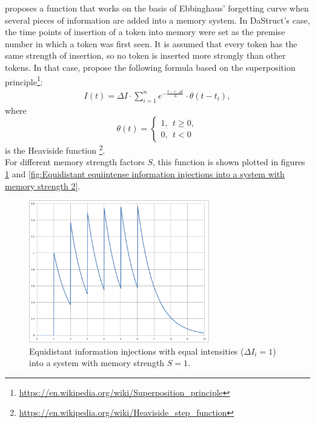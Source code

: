 \documentclass[hidelinks]{scrartcl}
\begin{document}
\cite*{Yffelti.2016} proposes a function that works on the basis of Ebbinghaus' forgetting curve when several pieces of information are added into a memory system. In DaStruct's case, the time points of insertion of a \gls{token} into memory were set as the \gls{premise} number in which a \gls{token} was first seen. It is assumed that every \gls{token} has the same strength of insertion, so no \gls{token} is inserted more strongly than other \gls{token}s. In that case, \cite{Yffelti.2016} propose the following formula based on the superposition principle\footnote{\url{https://en.wikipedia.org/wiki/Superposition_principle}}:
\begin{gather}
I(t) = \Delta I \cdot \sum \limits_{i=1}^n  e^{-\frac{t-i \cdot \Delta t}{S}} \cdot \theta(t - t_i),
\end{gather}
where 
\begin{equation}
  \theta(t)=\begin{cases}
               1, ~~t \geq 0, \\
               0, ~~t < 0
            \end{cases}
\end{equation}
is the Heaviside function \footnote{\url{https://en.wikipedia.org/wiki/Heaviside_step_function}}. \\

For different memory strength factors $S$, this function is shown plotted in figures \ref{fig:Equidistant equiintense information injections into a system with memory strength 1} and \ref{fig:Equidistant equiintense information injections into a system with memory strength 2}.

\begin{figure}[H]
\centering
\includegraphics[width=0.7\textwidth]{Illustrations/Equidistant_equiintense_with_S=1.png}
\caption{Equidistant information injections with equal intensities ($\Delta I_i = 1$) into a system with memory strength $S=1$.}
\label{fig:Equidistant equiintense information injections into a system with memory strength 1}
\end{figure}
\end{document}

